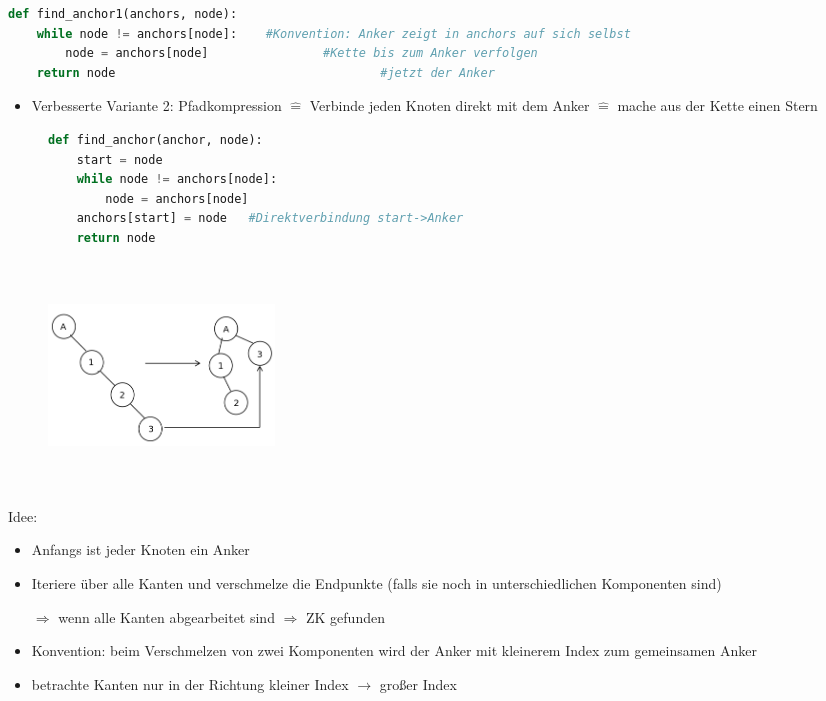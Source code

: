 \documentclass[11pt, fleqn]{scrreprt}
\begin{document}
			\begin{lstlisting}[language=Python]
def find_anchor1(anchors, node):
	while node != anchors[node]:    #Konvention: Anker zeigt in anchors auf sich selbst
		node = anchors[node]    			#Kette bis zum Anker verfolgen
	return node     								#jetzt der Anker
			\end{lstlisting}
			
			\begin{itemize}
				\item Verbesserte Variante 2: Pfadkompression $\widehat{=}$ Verbinde jeden Knoten direkt mit dem Anker $\widehat{=}$ mache aus der Kette einen Stern
			\end{itemize}
			
			\begin{figure}[htbp]
				\begin{minipage}[t]{11cm}
					\vspace{0cm}
					\begin{lstlisting}[language=Python]
def find_anchor(anchor, node):
	start = node
	while node != anchors[node]:
		node = anchors[node]
	anchors[start] = node   #Direktverbindung start->Anker
	return node
					\end{lstlisting}
				\end{minipage}
				\begin{minipage}[t]{6cm}
					\vspace{0.0cm}
					\includegraphics[width=6cm,height=6cm,keepaspectratio]{./Pictures/Stern.png}
				\end{minipage}
			\end{figure}
			
			
			Idee: 
			\begin{itemize}
				\item Anfangs ist jeder Knoten ein Anker
				\item Iteriere über alle Kanten und verschmelze die Endpunkte (falls sie noch in unterschiedlichen Komponenten sind)
				\item[$\Rightarrow$] wenn alle Kanten abgearbeitet sind $\Rightarrow$ ZK gefunden
				\item Konvention: beim Verschmelzen von zwei Komponenten wird der Anker mit kleinerem Index zum gemeinsamen Anker
				\item betrachte Kanten nur in der Richtung kleiner Index $\rightarrow$ großer Index
			\end{itemize}
			
\end{document}
